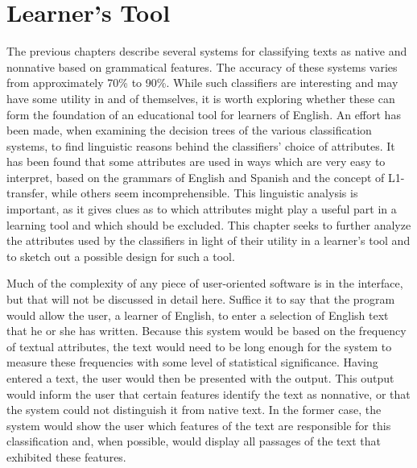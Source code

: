 \documentclass[main.tex]{subfiles}
\begin{document}
\section{Learner's Tool}
\setcounter{section}{8}
\setcounter{table}{0}
\setcounter{figure}{0}

The previous chapters describe several systems for classifying texts as native and nonnative based on grammatical features. The accuracy of these systems varies from approximately 70\% to 90\%. While such classifiers are interesting and may have some utility in and of themselves, it is worth exploring whether these can form the foundation of an educational tool for learners of English. An effort has been made, when examining the decision trees of the various classification systems, to find linguistic reasons behind the classifiers' choice of attributes. It has been found that some attributes are used in ways which are very easy to interpret, based on the grammars of English and Spanish and the concept of L1-transfer, while others seem incomprehensible. This linguistic analysis is important, as it gives clues as to which attributes might play a useful part in a learning tool and which should be excluded. This chapter seeks to further analyze the attributes used by the classifiers in light of their utility in a learner's tool and to sketch out a possible design for such a tool.

Much of the complexity of any piece of user-oriented software is in the interface, but that will not be discussed in detail here. Suffice it to say that the program would allow the user, a learner of English, to enter a selection of English text that he or she has written. Because this system would be based on the frequency of textual attributes, the text would need to be long enough for the system to measure these frequencies with some level of statistical significance. Having entered a text, the user would then be presented with the output. This output would inform the user that certain features identify the text as nonnative, or that the system could not distinguish it from native text. In the former case, the system would show the user which features of the text are responsible for this classification and, when possible, would display all passages of the text that exhibited these features.
\end{document}
